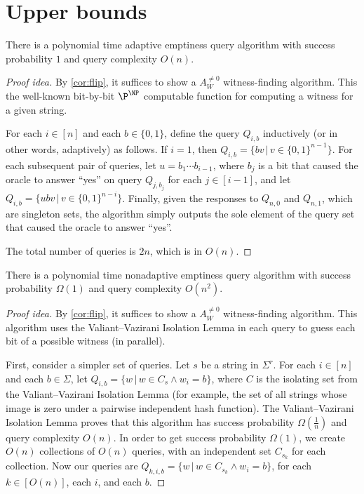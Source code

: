\documentclass{article}
\begin{document}
\section{Upper bounds}

\begin{theorem}\label{thm:naive}
  There is a polynomial time adaptive emptiness query algorithm with success probability $1$ and query complexity $O(n)$.
\end{theorem}
\begin{proof}[Proof idea]
  By \autoref{cor:flip}, it suffices to show a $A_W^{\neq 0}$ witness-finding algorithm.
  This the well-known bit-by-bit $\P^\NP$ computable function for computing a witness for a given string.

  For each $i \in [n]$ and each $b \in \{0, 1\}$, define the query $Q_{i, b}$ inductively (or in other words, adaptively) as follows.
  If $i = 1$, then $Q_{i, b} = \{ b v \, | \, v \in {\{0, 1\}}^{n - 1}\}$.
  For each subsequent pair of queries, let $u = b_1 \dotsb b_{i - 1}$, where $b_j$ is a bit that caused the oracle to answer ``yes'' on query $Q_{j, b_j}$ for each $j \in [i - 1]$, and let $Q_{i, b} = \{ u b v \, | \, v \in {\{0, 1\}}^{n - i}\}$.
  Finally, given the responses to $Q_{n, 0}$ and $Q_{n, 1}$, which are singleton sets, the algorithm simply outputs the sole element of the query set that caused the oracle to answer ``yes''.

  The total number of queries is $2n$, which is in $O(n)$.
\end{proof}

\begin{theorem}
  There is a polynomial time nonadaptive emptiness query algorithm with success probability $\Omega(1)$ and query complexity $O(n^2)$.
\end{theorem}
\begin{proof}[Proof idea]
  By \autoref{cor:flip}, it suffices to show a $A_W^{\neq 0}$ witness-finding algorithm.
  This algorithm uses the Valiant--Vazirani Isolation Lemma in each query to guess each bit of a possible witness (in parallel).

  First, consider a simpler set of queries.
  Let $s$ be a string in $\Sigma^r$.
  For each $i \in [n]$ and each $b \in \Sigma$, let $Q_{i, b} = \{ w \, | \, w \in C_s \land w_i = b\}$, where $C$ is the isolating set from the Valiant--Vazirani Isolation Lemma (for example, the set of all strings whose image is zero under a pairwise independent hash function).
  The Valiant--Vazirani Isolation Lemma proves that this algorithm has success probability $\Omega(\frac{1}{n})$ and query complexity $O(n)$.
  In order to get success probability $\Omega(1)$, we create $O(n)$ collections of $O(n)$ queries, with an independent set $C_{s_k}$ for each collection.
  Now our queries are $Q_{k, i, b} = \{ w \, | \, w \in C_{s_k} \land w_i = b\}$, for each $k \in \left[O(n)\right]$, each $i$, and each $b$.
\end{proof}
\end{document}
